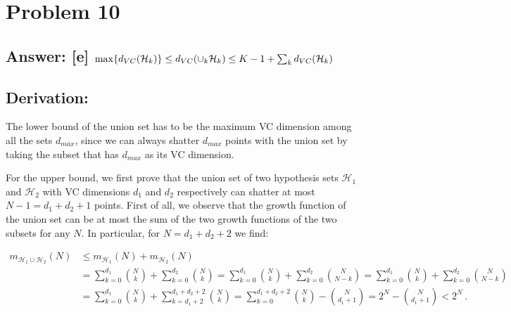 \documentclass[11pt]{article}
\begin{document}
    \hypertarget{problem-10}{%
\section{Problem 10}\label{problem-10}}

\hypertarget{answer-e-rm-maxd_vcmathcalh_kle-d_vccup_k-mathcalh_kle-k-1sum_k-d_vcmathcalh_k}{%
\subsection{\texorpdfstring{Answer: {[}e{]}
\({\rm max}\{d_{VC}(\mathcal{H}_k)\}\le d_{VC}(\cup_k \mathcal{H}_k)\le K-1+\sum_k d_{VC}(\mathcal{H}_k)\)}{Answer: {[}e{]} \{\textbackslash{}rm max\}\textbackslash{}\{d\_\{VC\}(\textbackslash{}mathcal\{H\}\_k)\textbackslash{}\}\textbackslash{}le d\_\{VC\}(\textbackslash{}cup\_k \textbackslash{}mathcal\{H\}\_k)\textbackslash{}le K-1+\textbackslash{}sum\_k d\_\{VC\}(\textbackslash{}mathcal\{H\}\_k)}}\label{answer-e-rm-maxd_vcmathcalh_kle-d_vccup_k-mathcalh_kle-k-1sum_k-d_vcmathcalh_k}}

\hypertarget{derivation}{%
\subsection{Derivation:}\label{derivation}}

The lower bound of the union set has to be the maximum VC dimension
among all the sets \(d_{max}\), since we can always shatter \(d_{max}\)
points with the union set by taking the subset that has \(d_{max}\) as
its VC dimension.

For the upper bound, we first prove that the union set of two hypothesis
sets \(\mathcal{H}_1\) and \(\mathcal{H}_2\) with VC dimensions \(d_1\)
and \(d_2\) respectively can shatter at most \(N-1=d_1+d_2+1\) points.
First of all, we observe that the growth function of the union set can
be at most the sum of the two growth functions of the two subsets for
any \(N\). In particular, for \(N=d_1+d_2+2\) we find:

\begin{equation}
\begin{split}
m_{\mathcal{H}_1\cup\mathcal{H}_2}(N)&\le m_{\mathcal{H}_1}(N)+m_{\mathcal{H}_2}(N) \\&=\sum_{k=0}^{d_{1}}{N\choose k}+\sum_{k=0}^{d_{2}}{N\choose k}=\sum_{k=0}^{d_{1}}{N\choose k}+\sum_{k=0}^{d_{2}}{N\choose N-k}=\sum_{k=0}^{d_{1}}{N\choose k}+\sum_{k=0}^{d_{2}}{N\choose N-k}\\&=\sum_{k=0}^{d_{1}}{N\choose k}+\sum_{k=d_1+2}^{d_1+d_{2}+2}{N\choose k}=\sum_{k=0}^{d_1+d_2+2}{N\choose k}-{N\choose d_1+1}=2^N-{N\choose d_1+1}<2^N\,.
\end{split}
\end{equation}
\end{document}
